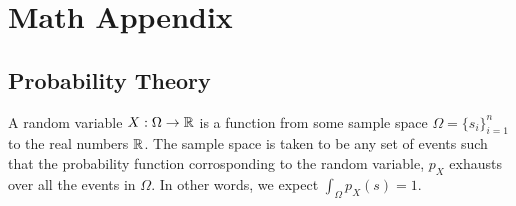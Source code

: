\chapter{Math Appendix}
\section{Probability Theory}
\begin{definition}
A random variable $X: \Omega \to \mathbb{R}$ is a function from some sample space $\Omega = \{s_i\}_{i=1}^n$ to the real numbers $\mathbb{R}$. The sample space is taken to be any set of events such that the probability function corrosponding to the random variable, $p_X$ exhausts over all the events in $\Omega$. In other words, we expect $\int_\Omega p_X(s) = 1$.
\end{definition}